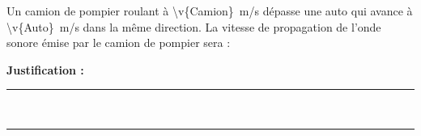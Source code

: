 Un camion de pompier roulant à \qty{\v{Camion}}{m/s} dépasse une auto qui avance à \qty{\v{Auto}}{m/s} dans la même direction. La vitesse de propagation de l’onde sonore émise par le camion de pompier sera :
\choices

\noindent\textbf{Justification :} \hrulefill \\[2.5ex]
\rule{\linewidth}{0.4pt} \\[2.5ex]
\rule{\linewidth}{0.4pt}
\vfill